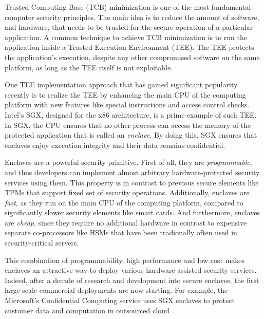 
\vspace{10pt}

Trusted Computing Base (TCB) minimization is one of the most fundamental computer security principles. The main idea is to reduce the amount of software, and hardware, that needs to be trusted for the secure operation of a particular application. A common technique to achieve TCB minimization is to run the application inside a Trusted Execution Environment (TEE). The TEE protects the application's execution, despite any other compromised software on the same platform, as long as the TEE itself is not exploitable. 

One TEE implementation approach that has gained significant popularity recently is to realize the TEE by enhancing the main CPU of the computing platform with new features like special instructions and access control checks. Intel's SGX, designed for the x86 architecture, is a prime example of such TEE. In SGX, the CPU ensures that no other process can access the memory of the protected application that is called an \emph{enclave}. By doing this, SGX ensures that enclaves enjoy execution integrity and their data remains confidential.  

Enclaves are a powerful security primitive. First of all, they are \emph{programmable}, and thus developers can implement almost arbitrary hardware-protected security services using them. This property is in contrast to previous secure elements like TPMs that support fixed set of security operations. Additionally, enclaves are \emph{fast}, as they run on the main CPU of the computing platform, compared to significantly slower security elements like smart cards. And furthermore, enclaves are \emph{cheap}, since they require no additional hardware in contrast to expensive separate co-processors like HSMs that have been tradionally often used in security-critical servers. 

This combination of programmability, high performance and low cost makes enclaves an attractive way to deploy various hardware-assisted security services. Indeed, after a decade of research and development into secure enclaves, the first large-scale commercial deployments are now starting. For example, the Microsoft's Confidential Computing service uses SGX enclaves to protect customer data and computation in outsourced cloud~\cite{russinovich2017introducing}.

